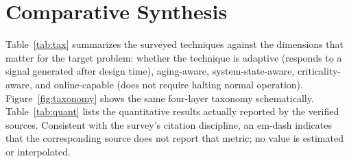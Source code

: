 \documentclass[journal]{IEEEtran}
\begin{document}
\section{Comparative Synthesis}
Table~\ref{tab:tax} summarizes the surveyed techniques against the dimensions that matter for the target problem: whether the technique is adaptive (responds to a signal generated after design time), aging-aware, system-state-aware, criticality-aware, and online-capable (does not require halting normal operation). Figure~\ref{fig:taxonomy} shows the same four-layer taxonomy schematically. Table~\ref{tab:quant} lists the quantitative results actually reported by the verified sources. Consistent with the survey's citation discipline, an em-dash indicates that the corresponding source does not report that metric; no value is estimated or interpolated.
\end{document}
